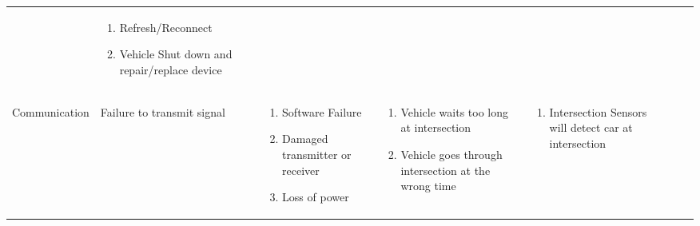 \documentclass [10pt]{article}
\begin{document}
{\begin{minipage}{\textwidth}
\begin{longtable}{ |p{ }  | p{ } |  p{ } |  p{ } | p{ } | p{ } |  p{ }|}
    
    & \begin{minipage}{.24 \columnwidth} 
                \vspace{2mm}
                \begin{enumerate}
                    \item Refresh/Reconnect 
                    \item Vehicle Shut down and repair/replace device\vspace {1mm}
                \end{enumerate}
        \end{minipage} \\ \cline{2-7}
    
    \multirow{-5}{*}{\begin{minipage} {.12\columnwidth}
    \begin{center} \small Communication \end{center}
    \end{minipage}\cellcolor{subsectionC} }
    & \cellcolor{tableCell}\begin{minipage} {.19\columnwidth}
            \begin{center} Failure to transmit signal \end{center}
        \end{minipage} 
    & \begin{minipage}{.22\textwidth} 
                \begin{enumerate}
                    \item Software Failure
                    \item Damaged transmitter or receiver 
                    \item Loss of power\vspace {1mm}
                \end{enumerate}
        \end{minipage}
    & \cellcolor{tableCell}\begin{minipage}{.22\textwidth} 
                \vspace{2mm}
                \begin{enumerate}
                    \item Vehicle waits too long at intersection
                    \item Vehicle goes through intersection at the wrong time\vspace {1mm}
                \end{enumerate}
        \end{minipage}
    & \begin{minipage}{.18\textwidth} 
                \begin{enumerate}
                    \item Intersection Sensors will detect car at intersection \vspace {1mm}
                \end{enumerate}
        \end{minipage}
    & \cellcolor{tableCell}
    

\end{longtable}
\end{minipage}}
\end{document}
